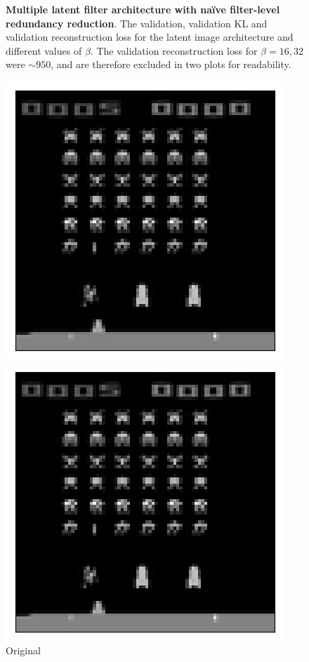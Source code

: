 \begin{figure}[h!]
\caption{\textbf{Multiple latent filter architecture with na{\"i}ve filter-level redundancy reduction}. The validation, validation KL and validation reconstruction loss for the latent image architecture and different values of $\beta$. The validation reconstruction loss for $\beta = 16, 32$ were $\sim 950$, and are therefore excluded in two plots for readability.}
\label{fig:naive_average_graphs}
\end{figure}


\begin{figure}[h!]
\centering
\captionsetup{justification=centering}
\begin{multicols}{4}
    \includegraphics[scale=0.4]{figures/results/naive_average/beta_1_sample_0_original.png}
    \caption{Original}
    \includegraphics[scale=0.4]{figures/results/naive_average/beta_1_sample_0_reconstructed.png}

\end{multicols}
\end{figure}

